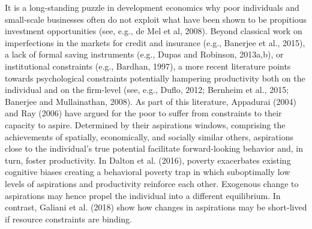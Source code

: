 \documentclass[11.5pt]{article}
\begin{document}
It is a long-standing puzzle in development economics why poor individuals and small-scale businesses often do not exploit what have been shown to be propitious investment opportunities (see, e.g., de Mel et al, 2008). Beyond classical work on imperfections in the markets for credit and insurance (e.g., Banerjee et al., 2015), a lack of formal saving instruments (e.g., Dupas and Robinson, 2013a,b), or institutional constraints (e.g., Bardhan, 1997), a more recent literature points towards psychological constraints potentially hampering productivity both on the individual and on the firm-level (see, e.g., Duflo, 2012; Bernheim et al., 2015; Banerjee and Mullainathan, 2008). As part of this literature, Appadurai (2004) and Ray (2006) have argued for the poor to suffer from constraints to their capacity to aspire. Determined by their aspirations windows, comprising the achievements of spatially, economically, and socially similar others, aspirations close to the individual's true potential facilitate forward-looking behavior and, in turn, foster productivity. In Dalton et al. (2016), poverty exacerbates existing cognitive biases creating a behavioral poverty trap in which suboptimally low levels of aspirations and productivity reinforce each other. Exogenous change to aspirations may hence propel the individual into a different equilibrium. In contrast, Galiani et al. (2018) show how changes in aspirations may be short-lived if resource constraints are binding.
\end{document}

